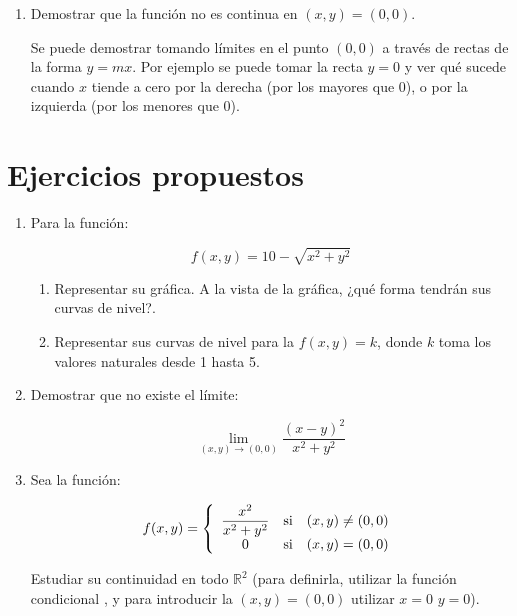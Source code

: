 \begin{enumerate}[leftmargin=*]
\begin{enumerate}
  \item Demostrar que la función no es continua en $(x,y)=(0,0)$.

\begin{indication}
{Se puede demostrar tomando límites en el punto $(0,0)$ a través
de rectas de la forma $y=mx$. Por ejemplo se puede tomar la recta
$y=0$ y ver qué sucede cuando $x$ tiende a cero por la derecha
(por los mayores que 0), o por la izquierda (por los menores que
0).


}
\end{indication}


\end{enumerate}
\end{enumerate}


\section{Ejercicios propuestos}
\begin{enumerate}

\item Para la función:

\[
f(x,y) = 10 - \sqrt {x^2  + y^2 }
\]

\begin{enumerate}
\item Representar su gráfica. A la vista de la gráfica, ¿qué forma
tendrán sus curvas de nivel?.

\item Representar sus curvas de nivel para la $f(x,y)=k$, donde
$k$ toma los valores naturales desde 1 hasta 5.
\end{enumerate}

\item Demostrar que no existe el límite:

\[
\mathop {\lim }\limits_{\left( {x,y} \right) \to \left( {0,0}
\right)} \frac{{\left( {x - y} \right)^2 }} {{x^2  + y^2 }}
\]

\item Sea la función:

\[
f(x,y) = \left\{ {\begin{array}{*{20}c}
   {\dfrac{{x^2 }}
{{x^2  + y^2 }}} & {\text{si}} & {\left( {x,y} \right) \ne \left( {0,0} \right)}  \\
   0 & {\text{si}} & {\left( {x,y} \right) = \left( {0,0} \right)}  \\

 \end{array} } \right.
\]

Estudiar su continuidad en todo $\mathbb{R}^2$ (para definirla,
utilizar la función condicional , y para introducir la
 $(x,y)=(0,0)$ utilizar $x=0$ 
$y=0$).
\end{enumerate}